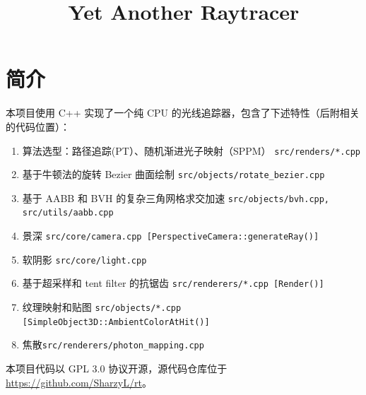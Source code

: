\documentclass[cn]{report}
\let\t\texttt
\begin{document}
    \title{Yet Another Raytracer}
    \maketitle
    \tableofcontents
    \newpage

    \section{简介}
    本项目使用 C++ 实现了一个纯 CPU 的光线追踪器，包含了下述特性（后附相关的代码位置）：

    \begin{enumerate}
        \item 算法选型：路径追踪(PT）、随机渐进光子映射（SPPM） \hfill\t{src/renders/*.cpp}
        \item 基于牛顿法的旋转 Bezier 曲面绘制 \hfill\t{src/objects/rotate\_bezier.cpp}
        \item 基于 AABB 和 BVH 的复杂三角网格求交加速 \hfill\t{src/objects/bvh.cpp, src/utils/aabb.cpp}
        \item 景深 \hfill\t{src/core/camera.cpp [PerspectiveCamera::generateRay()]}
        \item 软阴影 \hfill\t{src/core/light.cpp}
        \item 基于超采样和 tent filter 的抗锯齿 \hfill\t{src/renderers/*.cpp [Render()]}
        \item 纹理映射和贴图 \hfill \t{src/objects/*.cpp [SimpleObject3D::AmbientColorAtHit()]}
        \item 焦散\hfill \t{src/renderers/photon\_mapping.cpp}
    \end{enumerate}

    本项目代码以 GPL 3.0 协议开源，源代码仓库位于 \url{https://github.com/SharzyL/rt}。

\end{document}
